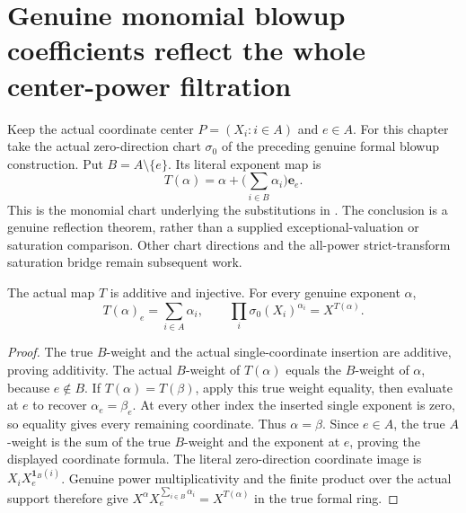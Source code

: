 \section{Genuine monomial blowup coefficients reflect the whole center-power filtration}

Keep the actual coordinate center $P=(X_i:i\in A)$ and $e\in A$.
For this chapter take the actual zero-direction chart $\sigma_0$ of the
preceding genuine formal blowup construction. Put $B=A\setminus\{e\}$.
Its literal exponent map is
\[
 T(\alpha)=\alpha+\bigl(\sum_{i\in B}\alpha_i\bigr)\mathbf e_e.
\]
This is the monomial chart underlying the substitutions in
\cite[\S7, pp.~267--272]{bierstone-milman97-invent-math}.
The conclusion is a genuine reflection theorem, rather than a supplied
exceptional-valuation or saturation comparison. Other chart directions
and the all-power strict-transform saturation bridge remain subsequent work.

\begin{lemma}
\label{hir:actual-formal-monomial-blowup-exponent-embedding}
The actual map $T$ is additive and injective. For every genuine exponent
$\alpha$,
\[
 T(\alpha)_e=\sum_{i\in A}\alpha_i,
 \qquad\prod_i\sigma_0(X_i)^{\alpha_i}=X^{T(\alpha)}.
\]
\leanok
\end{lemma}
\begin{proof}
The true $B$-weight and the actual single-coordinate insertion are
additive, proving additivity. The actual $B$-weight of $T(\alpha)$
equals the $B$-weight of $\alpha$, because $e\notin B$.
If $T(\alpha)=T(\beta)$, apply this true weight equality, then evaluate
at $e$ to recover $\alpha_e=\beta_e$. At every other index the inserted
single exponent is zero, so equality gives every remaining coordinate.
Thus $\alpha=\beta$.
Since $e\in A$, the true $A$-weight is the sum of the true $B$-weight
and the exponent at $e$, proving the displayed coordinate formula.
The literal zero-direction coordinate image is
$X_iX_e^{\mathbf1_B(i)}$. Genuine power multiplicativity and the finite
product over the actual support therefore give
$X^\alpha X_e^{\sum_{i\in B}\alpha_i}=X^{T(\alpha)}$ in the true formal ring.
\end{proof}

